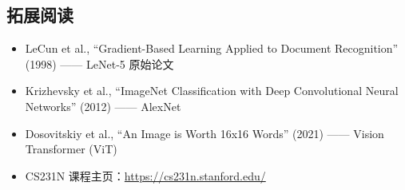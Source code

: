 \subsection{拓展阅读}

\begin{itemize}
    \item LeCun et al., ``Gradient-Based Learning Applied to Document Recognition'' (1998) —— LeNet-5 原始论文
    \item Krizhevsky et al., ``ImageNet Classification with Deep Convolutional Neural Networks'' (2012) —— AlexNet
    \item Dosovitskiy et al., ``An Image is Worth 16x16 Words'' (2021) —— Vision Transformer (ViT)
    \item CS231N 课程主页：\url{https://cs231n.stanford.edu/}
\end{itemize}


